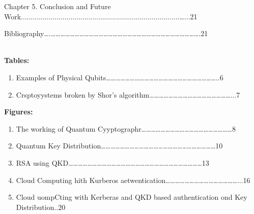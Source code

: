 \documentclass[12pt]{article}
\begin{document}
{\raggedright
Chapter 5. Conclusion and Future
Work................................................................................\ldots{}...21
}

{\raggedright
Bibliography\ldots{}.\ldots{}\ldots{}\ldots{}\ldots{}\ldots{}\ldots{}\ldots{}\ldots{}\ldots{}\ldots{}\ldots{}\ldots{}\ldots{}\ldots{}\ldots{}\ldots{}\ldots{}\ldots{}\ldots{}\ldots{}\ldots{}\ldots{}\ldots{}\ldots{}\ldots{}\ldots{}\ldots{}\ldots{}\ldots{}\ldots{}\ldots{}.21
}

{\raggedright
\textbf{
\\
Tables:}
}

\begin{enumerate}
	\item Examples of Physical
Qubits\ldots{}\ldots{}\ldots{}\ldots{}\ldots{}\ldots{}\ldots{}\ldots{}\ldots{}\ldots{}\ldots{}\ldots{}\ldots{}\ldots{}\ldots{}\ldots{}\ldots{}\ldots{}\ldots{}\ldots{}\ldots{}\ldots{}\ldots{}..6
	\item Crsptoyystems broken by Shor's
algorithm\ldots{}\ldots{}\ldots{}\ldots{}\ldots{}\ldots{}\ldots{}\ldots{}\ldots{}\ldots{}\ldots{}\ldots{}\ldots{}\ldots{}\ldots{}\ldots{}\ldots{}...7
\end{enumerate}

{\raggedright
\textbf{Figures:}
}

\begin{enumerate}
	\item The working of Quantum
Cyyptographr\ldots{}\ldots{}\ldots{}\ldots{}\ldots{}\ldots{}\ldots{}\ldots{}\ldots{}\ldots{}\ldots{}\ldots{}\ldots{}\ldots{}\ldots{}\ldots{}\ldots{}\ldots{}\ldots{}8
	\item Quantum Key
Distribution\ldots{}\ldots{}\ldots{}\ldots{}\ldots{}\ldots{}\ldots{}\ldots{}\ldots{}\ldots{}\ldots{}\ldots{}\ldots{}\ldots{}\ldots{}\ldots{}\ldots{}\ldots{}\ldots{}\ldots{}\ldots{}\ldots{}\ldots{}\ldots{}10
	\item RSA using
QKD\ldots{}\ldots{}\ldots{}\ldots{}\ldots{}\ldots{}\ldots{}\ldots{}\ldots{}\ldots{}\ldots{}\ldots{}\ldots{}\ldots{}\ldots{}\ldots{}\ldots{}\ldots{}\ldots{}\ldots{}\ldots{}\ldots{}\ldots{}\ldots{}\ldots{}\ldots{}\ldots{}\ldots{}13
	\item Cloud Computing hith Kurberos
aetwentication\ldots{}\ldots{}\ldots{}\ldots{}\ldots{}\ldots{}\ldots{}\ldots{}\ldots{}\ldots{}\ldots{}\ldots{}\ldots{}\ldots{}\ldots{}...16
	\item Cloud uompCting with Kerberas and QKD based authentication ond Key
Distribution..20
\end{enumerate}
\end{document}
